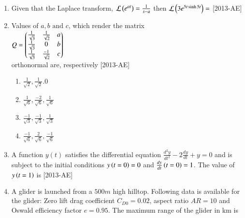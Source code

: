 \documentclass[journal]{IEEEtran}
\begin{document}
\begin{enumerate}[start=27]
\item Given that the Laplace transform, $\mathcal{L}\left(e^{at}\right)=\frac{1}{s-a}$ then $\mathcal{L}\left(3e^{5t \sinh{5t}}\right)=$ \hfill{[2013-AE]}
\begin{enumerate}
\end{enumerate}
\item Values of $a,b \text{ and } c$, which render the matrix\\
$Q=\begin{pmatrix}\frac{1}{\sqrt{3}}&\frac{1}{\sqrt{2}}&a\\ \frac{1}{\sqrt{3}}&0&b\\ \frac{1}{\sqrt{3}}&\frac{-1}{\sqrt{2}}&c\end{pmatrix}$\\
orthonormal are, respectively \hfill{[2013-AE]}
\begin{enumerate}
    \item $\frac{1}{\sqrt{2}},\frac{1}{\sqrt{2}}.0$\\
    \item $\frac{1}{\sqrt{6}},\frac{-2}{\sqrt{6}},\frac{1}{\sqrt{6}}$\\
    \item $\frac{-1}{\sqrt{3}},\frac{-1}{\sqrt{3}},\frac{1}{\sqrt{3}}$\\
    \item $\frac{-1}{\sqrt{6}},\frac{2}{\sqrt{6}},\frac{-1}{\sqrt{6}}$
\end{enumerate}
\item  A function $y(t)$ satisfies the differential equation $\frac{d^2 y}{dt^2}-2\frac{dy}{dt}+y=0$ and is subject to the initial conditions $y\left(t=0\right)=0$ and $\frac{dy}{dt}\left(t=0\right)=1$. The value of $y\left(t=1\right)$ is \hfill{[2013-AE]}
\begin{enumerate}
\end{enumerate}
\item A glider is launched from a $500m$ high hilltop. Following data is available for the glider: Zero lift drag coefficient $C_{D0}=0.02$, aspect ratio $AR=10$ and Oswald efficiency factor $e=0.95$. The maximum range of the glider in km is \underline{\hspace{1cm}}\\


\end{enumerate}
\end{document}
